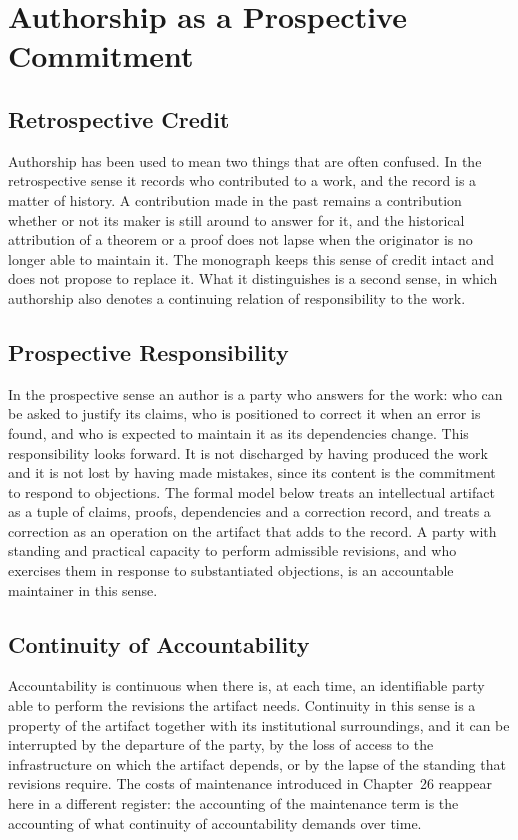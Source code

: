 \documentclass[11pt,letterpaper]{report}
\theoremstyle{plain}
\theoremstyle{definition}
\theoremstyle{remark}
\begin{document}
\chapter{Authorship as a Prospective Commitment}

\section{Retrospective Credit}

Authorship has been used to mean two things that are often confused. In the retrospective sense it records who contributed to a work, and the record is a matter of history. A contribution made in the past remains a contribution whether or not its maker is still around to answer for it, and the historical attribution of a theorem or a proof does not lapse when the originator is no longer able to maintain it. The monograph keeps this sense of credit intact and does not propose to replace it. What it distinguishes is a second sense, in which authorship also denotes a continuing relation of responsibility to the work.

\section{Prospective Responsibility}

In the prospective sense an author is a party who answers for the work: who can be asked to justify its claims, who is positioned to correct it when an error is found, and who is expected to maintain it as its dependencies change. This responsibility looks forward. It is not discharged by having produced the work and it is not lost by having made mistakes, since its content is the commitment to respond to objections. The formal model below treats an intellectual artifact as a tuple of claims, proofs, dependencies and a correction record, and treats a correction as an operation on the artifact that adds to the record. A party with standing and practical capacity to perform admissible revisions, and who exercises them in response to substantiated objections, is an accountable maintainer in this sense.

\section{Continuity of Accountability}

Accountability is continuous when there is, at each time, an identifiable party able to perform the revisions the artifact needs. Continuity in this sense is a property of the artifact together with its institutional surroundings, and it can be interrupted by the departure of the party, by the loss of access to the infrastructure on which the artifact depends, or by the lapse of the standing that revisions require. The costs of maintenance introduced in Chapter~26 reappear here in a different register: the accounting of the maintenance term is the accounting of what continuity of accountability demands over time.
\end{document}
